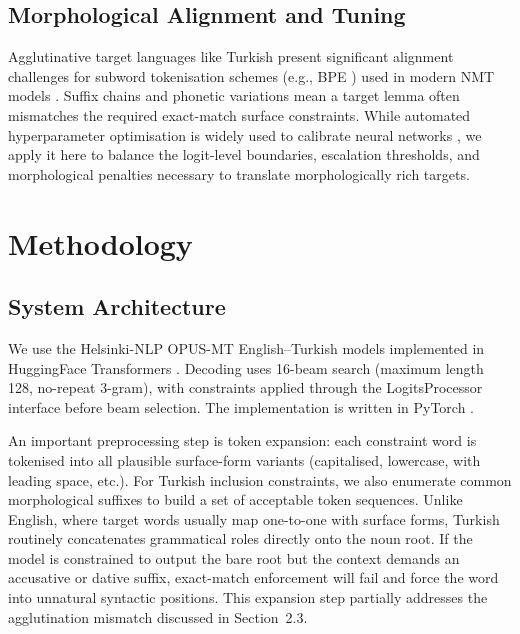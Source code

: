\documentclass{tlp}
\begin{document}
\subsection{Morphological Alignment and Tuning}

Agglutinative target languages like Turkish present significant alignment challenges
for subword tokenisation schemes (e.g., BPE \citep{sennrich2016bpe}) used in modern
NMT models \citep{tiedemann2020opus}. Suffix chains and phonetic variations mean a
target lemma often mismatches the required exact-match surface constraints. While
automated hyperparameter optimisation is widely used to calibrate neural networks
\citep{akiba2019optuna}, we apply it here to balance the logit-level boundaries,
escalation thresholds, and morphological penalties necessary to translate
morphologically rich targets.

\section{Methodology}

\subsection{System Architecture}

We use the Helsinki-NLP OPUS-MT English--Turkish models
\citep{tiedemann2020opus,tiedemann2023democratizing} implemented in HuggingFace
Transformers \citep{wolf2020transformers}. Decoding uses 16-beam search
\citep{freitag2017beam} (maximum length 128, no-repeat 3-gram), with constraints
applied through the LogitsProcessor interface before beam selection. The
implementation is written in PyTorch \citep{paszke2019pytorch}.

An important preprocessing step is token expansion: each constraint word is
tokenised into all plausible surface-form variants (capitalised, lowercase, with
leading space, etc.). For Turkish inclusion constraints, we also enumerate common
morphological suffixes to build a set of acceptable token sequences. Unlike English,
where target words usually map one-to-one with surface forms, Turkish routinely
concatenates grammatical roles directly onto the noun root. If the model is
constrained to output the bare root but the context demands an accusative or dative
suffix, exact-match enforcement will fail and force the word into unnatural syntactic
positions. This expansion step partially addresses the agglutination mismatch
discussed in Section~2.3.
\end{document}
